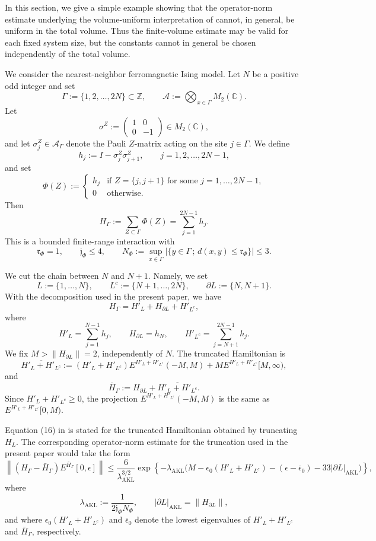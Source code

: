 \documentclass[11pt]{article}
\numberwithin{equation}{section}
\begin{document}
In this section, we give a simple example showing that the operator-norm estimate underlying the volume-uniform interpretation of \cite{Arad-Kuwahara-Landau 2016} cannot, in general, be uniform in the total volume. Thus the finite-volume estimate may be valid for each fixed system size, but the constants cannot in general be chosen independently of the total volume.

We consider the nearest-neighbor ferromagnetic Ising model. Let $N$ be a positive odd integer and set
\[
\Gamma:=\{1,2,\ldots,2N\}\subset\mathbb{Z}, \qquad\mathcal{A}:= \bigotimes_{x\in\Gamma}M_2(\mathbb{C}).
\]
Let
\[
\sigma^Z:=
\begin{pmatrix}
1&0\\
0&-1
\end{pmatrix}
\in M_2(\mathbb{C}),
\]
and let $\sigma_j^Z\in\mathcal{A}_\Gamma$ denote the Pauli $Z$-matrix acting on the site $j\in\Gamma$. We define
\[
h_j:=I-\sigma_j^Z\sigma_{j+1}^Z,\qquad j=1,2,\ldots,2N-1,
\]
and set
\[
\Phi(Z):=
\begin{cases}
h_j & \text{if } Z=\{j,j+1\}
\text{ for some }j=1,\ldots,2N-1,\\
0 & \text{otherwise}.
\end{cases}
\]
Then
\[
H_\Gamma:=\sum_{Z\subset\Gamma}\Phi(Z)
=\sum_{j=1}^{2N-1}h_j.
\]
This is a bounded finite-range interaction with
\[
\mathfrak{r}_\Phi=1,\qquad
\mathfrak{j}_\Phi\leq 4,\qquad
N_\Phi:=\sup_{x\in\Gamma}
\left|\{y\in\Gamma\,;\, d(x,y)\leq \mathfrak{r}_\Phi\}\right|\leq3.
\]

We cut the chain between $N$ and $N+1$. Namely, we set
\[
L:=\{1,\ldots,N\},\qquad
L^c:=\{N+1,\ldots,2N\},\qquad
\partial L:=\{N,N+1\}.
\]
With the decomposition used in the present paper, we have
\[
H_\Gamma=H'_L+H_{\partial L}+H'_{L^c},
\]
where
\[
H'_L=\sum_{j=1}^{N-1}h_j,\qquad
H_{\partial L}=h_N,\qquad
H'_{L^c}=\sum_{j=N+1}^{2N-1}h_j.
\]
We fix $M>\|H_{\partial L}\|=2$, independently of $N$. The truncated Hamiltonian is
\[
\overline{H'_L+H'_{L^c}}
:=(H'_L+H'_{L^c})E^{H'_L+H'_{L^c}}(-M,M)
+M E^{H'_L+H'_{L^c}}[M,\infty),
\]
and
\[
\bar{H}_\Gamma:=
H_{\partial L}+\overline{H'_L+H'_{L^c}}.
\]
Since $H'_L+H'_{L^c}\geq0$, the projection $E^{H'_L+H'_{L^c}}(-M,M)$ is the same as $E^{H'_L+H'_{L^c}}[0,M)$.

\medskip
Equation (16) in \cite{Arad-Kuwahara-Landau 2016} is stated for the truncated Hamiltonian obtained by truncating $H_L$. The corresponding operator-norm estimate for the truncation used in the present paper would take the form
\begin{equation}\label{eq_AKL_original}
\left\|(H_\Gamma-\bar{H}_\Gamma) E^{\bar{H}_\Gamma}[0,\epsilon]\right\|
\leq \frac{6}{\lambda_{\mathrm{AKL}}^{3/2}} \exp\left\{-\lambda_{\mathrm{AKL}}\bigl(M-\epsilon_0(H'_L+H'_{L^c})-(\epsilon-\bar\epsilon_0)-33|\partial L|_{\mathrm{AKL}} \bigr)\right\},
\end{equation}
where
\[
\lambda_{\mathrm{AKL}}:=\frac{1}{2\mathfrak{j}_\Phi N_\Phi},\qquad |\partial L|_{\mathrm{AKL}}=\|H_{\partial L}\|,
\]
and where $\epsilon_0(H'_L+H'_{L^c})$ and $\bar{\epsilon}_0$ denote the lowest eigenvalues of $H'_L+H'_{L^c}$ and $\bar{H}_\Gamma$, respectively.
\end{document}

